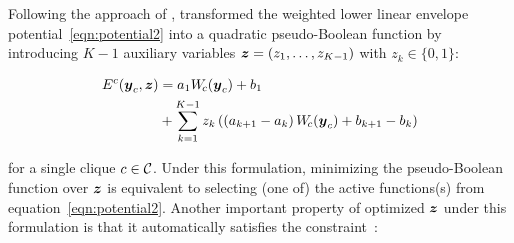 \documentclass[sigconf, anonymous, review]{acmart}
\renewcommand{\citename}{\citet}
\renewcommand{\cite}{\citep}
\begin{document}
Following the approach of \citename{Kohli:CVPR10},
\citename{Gould:ICML2011,gouldlearning} transformed the weighted
lower linear envelope potential~\eqref{eqn:potential2} into a
quadratic pseudo-Boolean function by introducing $K-1$ auxiliary
variables ${\boldsymbol{z}} = \left(z_1, \ldots, z_{K-1}\right)$ with $z_k\in
\{0,1\}$:

\begin{align}
  E^c({\boldsymbol{y}}_c, {\boldsymbol{z}}) &= a_1 W_{\!c}({\boldsymbol{y}}_c) + b_1 \notag \\
  &+ \sum_{k = 1}^{K-1} z_k \left( \left(a_{k+1} - a_k\right) W_{\!c}({\boldsymbol{y}}_c) + b_{k+1} - b_k \right)
  \label{eqn:binary_concave_z}
\end{align}

\noindent for a single clique $c \in {\cal C}$. Under this formulation,
minimizing the pseudo-Boolean function over ${\boldsymbol{z}}$ is equivalent
to selecting (one of) the active functions(s) from
equation~\eqref{eqn:potential2}. Another important property of
optimized ${\boldsymbol{z}}$ under this formulation is that it automatically
satisfies the constraint~\cite{gouldlearning}:
\end{document}
